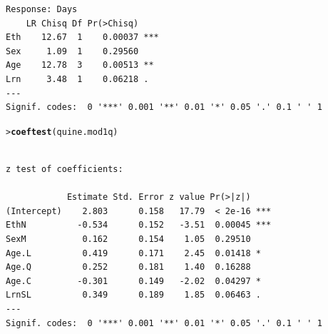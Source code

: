 \documentclass[10pt]{report}\usepackage[]{graphicx}\usepackage[]{color}
\makeatletter
\newcommand{\hlstd}[1]{\textcolor[rgb]{0.345,0.345,0.345}{#1}}%
\newcommand{\hlkwd}[1]{\textcolor[rgb]{0.737,0.353,0.396}{\textbf{#1}}}%
\newenvironment{kframe}{%
 \def\at@end@of@kframe{}%
 \ifinner\ifhmode%
  \def\at@end@of@kframe{\end{minipage}}%
  \begin{minipage}{\columnwidth}%
 \fi\fi%
 \def\FrameCommand##1{\hskip\@totalleftmargin \hskip-\fboxsep
 \colorbox{shadecolor}{##1}\hskip-\fboxsep
     \hskip-\linewidth \hskip-\@totalleftmargin \hskip\columnwidth}%
 \MakeFramed {\advance\hsize-\width
   \@totalleftmargin\z@ \linewidth\hsize
   \@setminipage}}%
 {\par\unskip\endMakeFramed%
 \at@end@of@kframe}
\newenvironment{knitrout}{}{} %
\renewenvironment{knitrout}{\small\renewcommand{\baselinestretch}{.85}}{} %
\makeatother
\begin{document}
\begin{Exercises}
\begin{enumerate*}
\begin{ans}
\begin{knitrout}
\begin{kframe}
\begin{verbatim}
Response: Days
    LR Chisq Df Pr(>Chisq)    
Eth    12.67  1    0.00037 ***
Sex     1.09  1    0.29560    
Age    12.78  3    0.00513 ** 
Lrn     3.48  1    0.06218 .  
---
Signif. codes:  0 '***' 0.001 '**' 0.01 '*' 0.05 '.' 0.1 ' ' 1
\end{verbatim}
\begin{alltt}
\hlstd{> }\hlkwd{coeftest}\hlstd{(quine.mod1q)}
\end{alltt}
\begin{verbatim}

z test of coefficients:

            Estimate Std. Error z value Pr(>|z|)    
(Intercept)    2.803      0.158   17.79  < 2e-16 ***
EthN          -0.534      0.152   -3.51  0.00045 ***
SexM           0.162      0.154    1.05  0.29510    
Age.L          0.419      0.171    2.45  0.01418 *  
Age.Q          0.252      0.181    1.40  0.16288    
Age.C         -0.301      0.149   -2.02  0.04297 *  
LrnSL          0.349      0.189    1.85  0.06463 .  
---
Signif. codes:  0 '***' 0.001 '**' 0.01 '*' 0.05 '.' 0.1 ' ' 1
\end{verbatim}
\end{kframe}
\end{knitrout}

    \end{ans}
    
   \end{enumerate*}


\end{Exercises}
\end{document}
